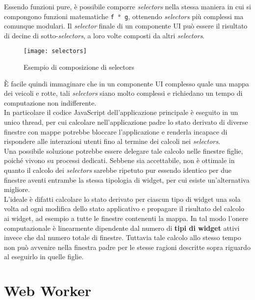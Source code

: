 Essendo funzioni pure, è possibile comporre \textit{selectors} nella stessa maniera in cui si compongono funzioni matematiche \texttt{f ° g}, ottenendo \textit{selectors} più complessi ma comunque modulari. Il \textit{selector} finale di un componente UI può essere il risultato di decine di sotto-\textit{selectors}, a loro volte composti da altri \textit{selectors}.

\begin{figure}[H] 
  \centering 
  \texttt{[image: selectors]} 
  \caption{Esempio di composizione di selectors}
\end{figure}

È facile quindi immaginare che in un componente UI complesso quale una mappa dei veicoli e rotte, tali \textit{selectors} siano molto complessi e richiedano un tempo di computazione non indifferente. \\

In particolare il codice JavaScript dell'applicazione principale è eseguito in un unico thread, per cui calcolare nell'applicazione padre lo stato derivato di diverse finestre con mappe potrebbe bloccare l'applicazione e renderla incapace di rispondere alle interazioni utenti fino al termine dei calcoli nei \textit{selectors}. \\

Una possibile soluzione potrebbe essere delegare tale calcolo nelle finestre figlie, poiché vivono su processi dedicati. Sebbene sia accettabile, non è ottimale in quanto il calcolo dei \textit{selectors} sarebbe ripetuto pur essendo identico per due finestre aventi entrambe la stessa tipologia di widget, per cui esiste un'alternativa migliore. \\

L'ideale è difatti calcolare lo stato derivato per ciascun tipo di widget una sola volta ad ogni modifica dello stato applicativo e propagare il risultato del calcolo ai widget, ad esempio a tutte le finestre contenenti la mappa. In tal modo l'onere computazionale è linearmente dipendente dal numero di \textbf{tipi di widget} attivi invece che dal numero totale di finestre. Tuttavia tale calcolo allo stesso tempo non può avvenire nella finestra padre per le stesse ragioni descritte sopra riguardo al eseguirlo in quelle figlie.

\section{Web Worker}\label{webworker}

